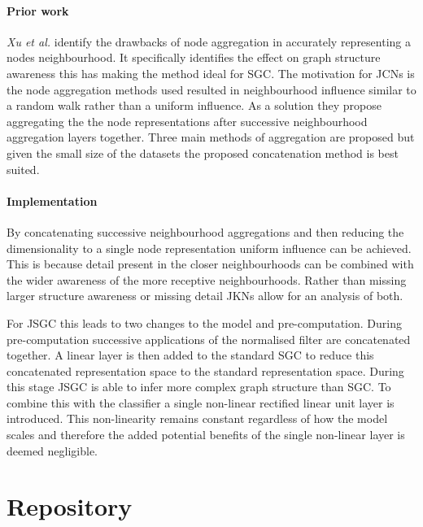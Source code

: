 \paragraph{Prior work}
\textit{Xu et al.}\cite{xu2018representation} identify the drawbacks of node aggregation in accurately representing a nodes neighbourhood.
It specifically identifies the effect on graph structure awareness this has making the method ideal for SGC.
The motivation for JCNs is the node aggregation methods used resulted in neighbourhood influence similar to a random walk rather than a uniform influence.
As a solution they propose aggregating the the node representations after successive neighbourhood aggregation layers together.
Three main methods of aggregation are proposed but given the small size of the datasets the proposed concatenation method is best suited.

\paragraph{Implementation}
By concatenating successive neighbourhood aggregations and then reducing the dimensionality to a single node representation uniform influence can be achieved.
This is because detail present in the closer neighbourhoods can be combined with the wider awareness of the more receptive neighbourhoods.
Rather than missing larger structure awareness or missing detail JKNs allow for an analysis of both.

For JSGC this leads to two changes to the model and pre-computation.
During pre-computation successive applications of the normalised filter are concatenated together.
A linear layer is then added to the standard SGC to reduce this concatenated representation space to the standard representation space.
During this stage JSGC is able to infer more complex graph structure than SGC.
To combine this with the classifier a single non-linear rectified linear unit layer is introduced.
This non-linearity remains constant regardless of how the model scales and therefore the added potential benefits of the single non-linear layer is deemed negligible.

\section{Repository}

